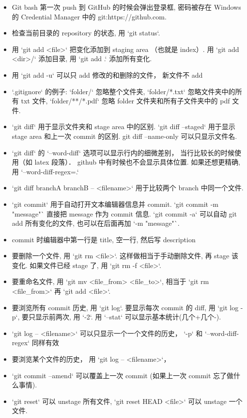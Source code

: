 \begin{itemize}
\item Git bash 第一次 push 到 GitHub 的时候会弹出登录框, 密码被存在 Windows 的 Credential Manager 中的 git:https://github.com.
\item 检查当前目录的 repository 的状态, 用 `git status`. 
\item 用 `git add <file>` 把变化添加到 staging area （也就是 index）. 用 `git add <dir>/` 添加目录, 用 `git add .` 添加所有变化.
\item 用 `git add -u` 可以只 add 修改的和删除的文件， 新文件不 add
\item `.gitignore` 的例子: `folder/` 忽略整个文件夹, `folder/*.txt` 忽略文件夹中的所有 txt 文件, `folder/**/*.pdf` 忽略 folder 文件夹和所有子文件夹中的 pdf 文件.
\item `git diff` 用于显示文件夹和 stage area 中的区别. `git diff --staged` 用于显示 stage area 和上一次 commit 的区别. git diff --name-only  可以只显示文件名.
\item `git diff` 的 `--word-diff` 选项可以显示行内的细微差别， 当行比较长的时候使用（如 latex 段落）． github 中有时候也不会显示具体位置. 如果还想更精确, 用 `--word-diff-regex=.`
\item `git diff branchA branchB -- <filename>` 用于比较两个 branch 中同一个文件.
\item `git commit` 用于自动打开文本编辑器信息并 commit. `git commit -m "message"` 直接把 message 作为 commit 信息. `git commit -a` 可以自动 git add 所有变化的文件, 也可以在后面再加 `-m "message"`.
\item commit 时编辑器中第一行是 title, 空一行, 然后写 description
\item 要删除一个文件, 用 `git rm <file>`. 这样做相当于手动删除文件, 再 stage 该变化. 如果文件已经 stage 了, 用 `git rm -f <file>`.
\item 要重命名文件, 用 `git mv <file_from> <file_to>`, 相当于 `git rm <file_from>` 再 `git add <file>`.
\item 要浏览所有 commit 历史, 用 `git log`. 要显示每次 commit 的 diff, 用 `git log -p`, 要只显示前两次, 用 `-2`. 用 `--stat` 可以显示基本统计(几个+几个-).
\item `git log -- <filename>` 可以只显示一个一个文件的历史， `-p` 和 `--word-diff-regex` 同样有效
\item 要浏览某个文件的历史， 用 `git log -- <filename>`， 
\item `git commit --amend` 可以覆盖上一次 commit (如果上一次 commit 忘了做什么事情).
\item `git reset` 可以 unstage 所有文件, `git reset HEAD <file>` 可以 unstage 一个文件.

\end{itemize}
